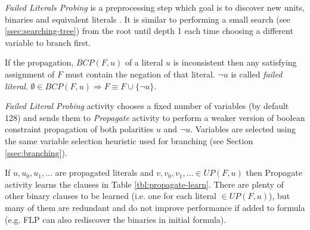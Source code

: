 \emph{Failed Literals Probing} is a preprocessing step which
goal is to discover new units, binaries and equivalent literals
\cite{Lynce03probing-basedpreprocessing}.  It is similar to
performing a small search (see \ref{ssec:searching-tree}) from
the root until depth 1 each time choosing a different variable to
branch first.

\begin{myprop}
  If the propagation, $BCP(F, u)$ of a literal $u$ is inconsistent
  then any satisfying assignment of $F$ must contain the negation
  of that literal. $\neg u$ is called \emph{failed literal}.
  $\emptyset \in BCP(F, u) \Rightarrow F \equiv F \cup \{\neg u\}$.
\end{myprop}


\emph{Failed Literal Probing} activity chooses a fixed number of
variables (by default 128) and sends them to \emph{Propagate}
activity to perform a weaker version of boolean constraint
propagation of both polarities $u$ and $\neg u$. Variables are
selected using the same variable selection heuristic used for
branching (see Section \ref{ssec:branching}).

If $u, u_0, u_1, \ldots$ are propagated literals and $v, v_0, v_1,
\ldots \in UP(F, u)$ then Propagate activity learns the clauses in
Table \ref{tbl:propagate-learn}. There are plenty of other binary
clauses to be learned (i.e. one for each literal $\in UP(F, u)$),
but many of them are redundant and do not improve performance if
added to formula (e.g. FLP can also rediscover the binaries in
initial formula).

\begin{table}[h]
  \centering
  \caption{Learned units and binaries by Propagate activity.}
  \label{tbl:propagate-learn}
\end{table}



